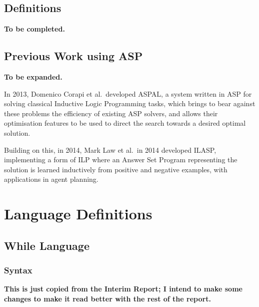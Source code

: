 \documentclass[a4paper,twoside,notitlepage]{article}
\begin{document}
\subsection{Definitions}
\textbf{To be completed.}

\subsection{Previous Work using ASP}
\textbf{To be expanded.}

In 2013, Domenico Corapi et al.\ developed ASPAL\cite{aspal}, a system 
written in ASP for solving classical Inductive Logic Programming tasks, 
which brings to bear against these problems the efficiency of existing ASP 
solvers, and allows their optimisation features to be used to direct the 
search towards a desired optimal solution.

Building on this, in 2014, Mark Law et al.\ in 2014 developed 
ILASP\cite{ilasp}, implementing a form of ILP where an Answer Set Program 
representing the solution is learned inductively from positive and negative 
examples, with applications in agent planning.

\clearpage

\section{Language Definitions}
\subsection{While Language} \label{sec:whilan}

\subsubsection{Syntax}
\textbf{This is just copied from the Interim Report; I intend to make some 
changes to make it read better with the rest of the report.}
\end{document}
